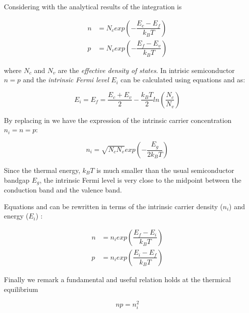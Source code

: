 Considering  with  the analytical results of the integration is

\begin{align}
n & = N_c exp\left(-\dfrac{E_c-E_f}{k_BT}\right) \label{eq: n density fd}\\
p & = N_v exp\left(-\dfrac{E_f-E_v}{k_B T}\right)  \label{eq: p density fd}
\end{align}

where $N_c$ and $N_v$ are the \textit{effective density of states}.
In intrisic semiconductor $n=p$ and the \textit{intrinsic Fermi level} $E_i$ can be calculated using equations  and  as:

\begin{equation}
\label{eq: midgap equilibrium}
E_i=E_f=\dfrac{E_c+E_v}{2} - \dfrac{k_B T}{2}ln\left(\dfrac{N_c}{N_v}\right)
\end{equation}

By replacing  in  we have the expression of the intrinsic carrier concentration $n_i=n=p$:


\begin{equation}
\label{eq: ni equilibrium NcNv}
n_i = \sqrt{N_cN_v}exp\left(-\dfrac{E_g}{2k_B T}\right)
\end{equation}

\begin{Osservazione}
Since the thermal energy, $k_BT$ is much smaller than the usual semiconductor bandgap $E_g$, the intrinsic Fermi level is very close to the midpoint between the conduction band and the valence band.
\end{Osservazione}

Equations  and  can be rewritten in terms of the intrinsic carrier density ($n_i$) and energy ($E_i$) :

\begin{align}
n & = n_i exp\left(\dfrac{E_f-E_i}{k_B T}\right) \label{eq: n density mb}\\
p & = n_i exp\left(\dfrac{E_i-E_f}{k_B T}\right)  \label{eq: p density mb}
\end{align}

Finally we remark a fundamental and useful relation holds at the thermical equilibrium

\begin{equation}
\label{eq: legge di azione di massa}
np=n_i^2
\end{equation}

